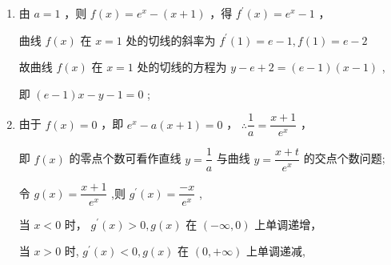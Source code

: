 \begin{enumerate}
\begin{enumerate}
\begin{jieda}
\begin{enumerate}
                当 $a > 0$ 时，令 ${f}^{\prime }\left( x\right)  = 0$ ，解得 $x = \ln a$ ，
                
                所以当 $x \in  \left( {\ln a, + \infty }\right)$ 时， ${f}^{\prime }\left( x\right)  > 0,f\left( x\right)$ 单调递增；
                
                当 $x \in  \left( {-\infty ,\ln a}\right)$ 时， ${f}^{\prime }\left( x\right)  < 0,f\left( x\right)$ 单调递减；
                
                综上,当 $a \leq  0$ 时, $f\left( x\right)$ 在 ${R}$ 上单调递增;
                
                当 $a > 0$ 时, $f\left( x\right)$ 在 $\left( {\ln a, + \infty }\right)$ 上单调递增,在 $\left( {-\infty ,\ln a}\right)$ 上单调递减
                
                \item 由 $a = 1$ ，则 $f\left( x\right)  = {{e}}^{x} - \left( {x + 1}\right)$ ，得 ${f}^{\prime }\left( x\right)  = {{e}}^{x} - 1$ ，
                
                曲线 $f\left( x\right)$ 在 $x = 1$ 处的切线的斜率为 ${f}^{\prime }\left( 1\right)  = {e} - 1,f\left( 1\right)  = {e} - 2$
                
                故曲线 $f\left( x\right)$ 在 $x = 1$ 处的切线的方程为 $y - {e} + 2 = \left( {{e} - 1}\right) \left( {x - 1}\right)$ ,
                
                即 $\left( {{e} - 1}\right) x - y - 1 = 0$ ;
                
                \item 由于 $f\left( x\right)  = 0$ ，即 ${{e}}^{x} - a\left( {x + 1}\right)  = 0$ ， $\therefore \dfrac{1}{a} = \dfrac{x + 1}{{{e}}^{x}}$ ，
                
                即 $f\left( x\right)$ 的零点个数可看作直线 $y = \dfrac{1}{a}$ 与曲线 $y = \dfrac{x + t}{{{e}}^{x}}$ 的交点个数问题;
                
                令 $g\left( x\right)  = \dfrac{x + 1}{{{e}}^{x}}$ ,则 ${g}^{\prime }\left( x\right)  = \dfrac{-x}{{{e}}^{x}}$ ,
                
                当 $x < 0$ 时， ${g}^{\prime }\left( x\right)  > 0,g\left( x\right)$ 在 $\left( {-\infty ,0}\right)$ 上单调递增，
                
                当 $x > 0$ 时, ${g}^{\prime }\left( x\right)  < 0,g\left( x\right)$ 在 $\left( {0, + \infty }\right)$ 上单调递减,
                

\end{enumerate}
\end{jieda}
\end{enumerate}
\end{enumerate}
